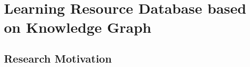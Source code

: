 
\chapter{Learning Resource Database based on Knowledge Graph}

\ifpdf
    \graphicspath{{Chapter2/Figs/Raster/}{Chapter2/Figs/PDF/}{Chapter2/Figs/}}
\else
    \graphicspath{{Chapter2/Figs/Vector/}{Chapter2/Figs/}}
\fi


\section{Research Motivation}


